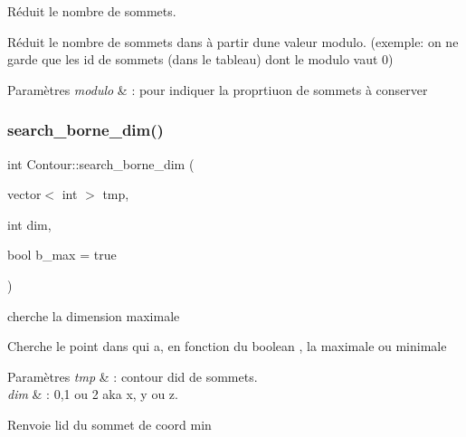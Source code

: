 Réduit le nombre de sommets. 

Réduit le nombre de sommets dans  à partir d\textquotesingle{}une valeur modulo. (exemple\+: on ne garde que les id de sommets (dans le tableau) dont le modulo  vaut 0)


\begin{DoxyParams}{Paramètres}
{\em modulo} & \+: pour indiquer la proprtiuon de sommets à conserver \\
\hline
\end{DoxyParams}
\mbox{\label{classContour_a7c98ec3dde7850d673a63e2f6cddcb45}} 
\subsubsection{\texorpdfstring{search\+\_\+borne\+\_\+dim()}{search\_borne\_dim()}}
{\footnotesize\ttfamily int Contour\+::search\+\_\+borne\+\_\+dim (\begin{DoxyParamCaption}\item[{vector$<$ int $>$}]{tmp,  }\item[{int}]{dim,  }\item[{bool}]{b\+\_\+max = {\ttfamily true} }\end{DoxyParamCaption})\hspace{0.3cm}{\ttfamily [protected]}}



cherche la dimension maximale 

Cherche le point dans  qui a, en fonction du boolean , la  maximale ou minimale


\begin{DoxyParams}{Paramètres}
{\em tmp} & \+: contour d\textquotesingle{}id de sommets. \\
\hline
{\em dim} & \+: 0,1 ou 2 aka x, y ou z.\\
\hline
\end{DoxyParams}
\begin{DoxyReturn}{Renvoie}
l\textquotesingle{}id du sommet de coord min 
\end{DoxyReturn}
\mbox{\label{classContour_aaf1e67f8e917e3fc50620f8d91aba100}} 
